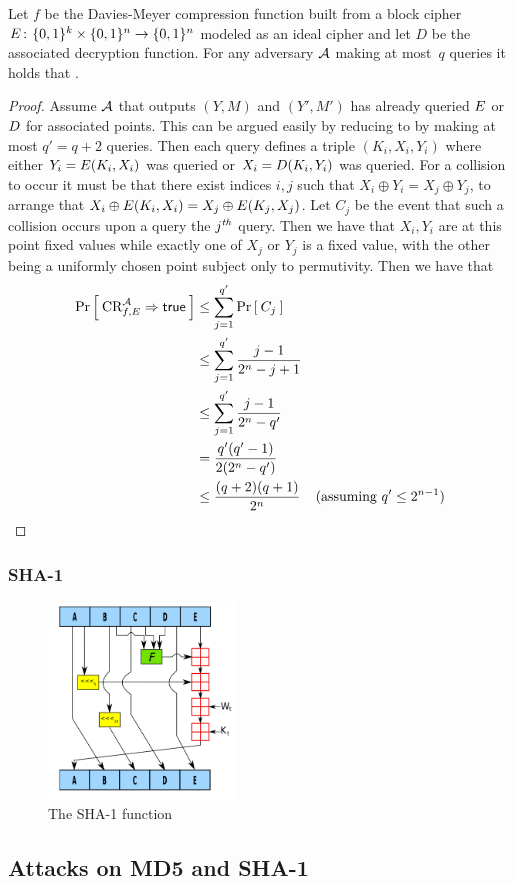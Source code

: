 \begin{theorem*}
Let $f$ be the Davies-Meyer compression function built from a block cipher
$E{{\kern .05em}\colon{\kern .05em}}\{0,1\}^k\times\{0,1\}^n\rightarrow\{0,1\}^n$ modeled as an ideal
cipher and let $D$ be the associated decryption function.
For any adversary ${\mathcal A}$ making at most~$q$ queries it holds that
\bnm
   \le {} \;.
\enm
\end{theorem*}

\begin{proof}
Assume ${\mathcal A}$ that outputs $(Y,M)$ and $(Y',M')$ has already queried $E$
or $D$ for associated points. This can be argued easily by reducing to
by making at most $q' = q+2$ queries.
Then each query defines a triple $(K_i,X_i,Y_i)$ where either $Y_i = E(K_i,X_i)$ was queried or $X_i =
D(K_i,Y_i)$ was queried. For a collision to occur it must be that there
exist indices $i,j$ such that $X_i \oplus Y_i = X_j \oplus Y_j$, to arrange that
$X_i \oplus E(K_i,X_i) = X_j \oplus E(K_j,X_j)$. Let $C_j$ be the
event that such a collision occurs upon a query the $j^{\textit{th}}$ query. Then we have
that $X_i,Y_i$ are at this point fixed values while exactly one of $X_j$ or
$Y_j$ is a fixed value, with the other being a uniformly chosen point subject
only to permutivity. Then we have that 
\begin{align*}
\Pr\left[\: \textnormal{CR}_{f,E}^{\mathcal A}\Rightarrow\mathsf{true} \:\right] 
    &\le \sum_{j=1}^{q'} \Pr\left[\: C_j \:\right]  &  \\
    &\le \sum_{j=1}^{q'} \frac{j-1}{2^n-j+1} &\\
    &\le \sum_{j=1}^{q'} \frac{j-1}{2^n-q'} &\\
    &= \frac{q'(q'-1)}{2(2^n-q')} & \\
    &\le \frac{(q+2)(q+1)}{2^n} &( \text{assuming }q' \leq 2^{n-1} ) \\
\end{align*}
\end{proof}

\subsubsection{SHA-1}
\begin{figure}
    \includegraphics[width=5cm]{hash/sha1}
    \caption{The SHA-1 function}
\end{figure}

\subsection{Attacks on MD5 and SHA-1}


